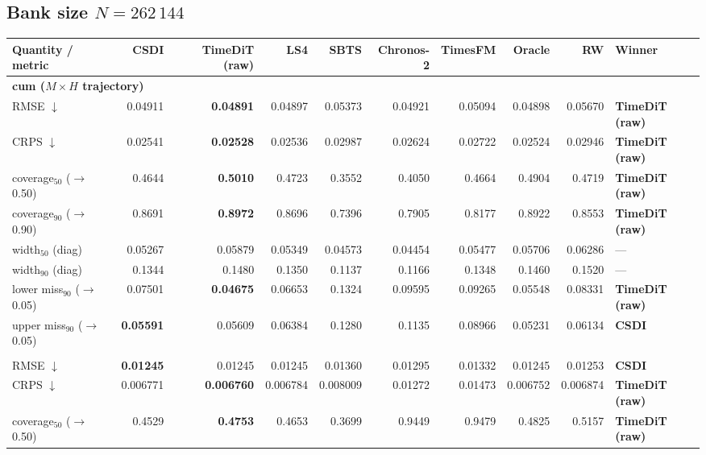 \documentclass[11pt,a4paper]{article}
\begin{document}
\begin{landscape}
\subsection{Bank size $N = 262\,144$}
\begin{center}\footnotesize
\begin{tabular}{lrrrrrrrrl}
\toprule
Quantity / metric & CSDI & TimeDiT (raw) & LS4 & SBTS & Chronos-2 & TimesFM & Oracle & RW & Winner \\
\midrule
\multicolumn{10}{l}{\textbf{cum ($M\times H$ trajectory)}} \\
RMSE $\downarrow$ & 0.04911 & \textbf{0.04891} & 0.04897 & 0.05373 & 0.04921 & 0.05094 & 0.04898 & 0.05670 & \textbf{TimeDiT (raw)} \\
CRPS $\downarrow$ & 0.02541 & \textbf{0.02528} & 0.02536 & 0.02987 & 0.02624 & 0.02722 & 0.02524 & 0.02946 & \textbf{TimeDiT (raw)} \\
coverage$_{50}$ ($\to$0.50) & 0.4644 & \textbf{0.5010} & 0.4723 & 0.3552 & 0.4050 & 0.4664 & 0.4904 & 0.4719 & \textbf{TimeDiT (raw)} \\
coverage$_{90}$ ($\to$0.90) & 0.8691 & \textbf{0.8972} & 0.8696 & 0.7396 & 0.7905 & 0.8177 & 0.8922 & 0.8553 & \textbf{TimeDiT (raw)} \\
width$_{50}$ (diag) & 0.05267 & 0.05879 & 0.05349 & 0.04573 & 0.04454 & 0.05477 & 0.05706 & 0.06286 & --- \\
width$_{90}$ (diag) & 0.1344 & 0.1480 & 0.1350 & 0.1137 & 0.1166 & 0.1348 & 0.1460 & 0.1520 & --- \\
lower miss$_{90}$ ($\to$0.05) & 0.07501 & \textbf{0.04675} & 0.06653 & 0.1324 & 0.09595 & 0.09265 & 0.05548 & 0.08331 & \textbf{TimeDiT (raw)} \\
upper miss$_{90}$ ($\to$0.05) & \textbf{0.05591} & 0.05609 & 0.06384 & 0.1280 & 0.1135 & 0.08966 & 0.05231 & 0.06134 & \textbf{CSDI} \\
\addlinespace
\multicolumn{10}{l}{\textbf{step ($M\times H$)}} \\
RMSE $\downarrow$ & \textbf{0.01245} & 0.01245 & 0.01245 & 0.01360 & 0.01295 & 0.01332 & 0.01245 & 0.01253 & \textbf{CSDI} \\
CRPS $\downarrow$ & 0.006771 & \textbf{0.006760} & 0.006784 & 0.008009 & 0.01272 & 0.01473 & 0.006752 & 0.006874 & \textbf{TimeDiT (raw)} \\
coverage$_{50}$ ($\to$0.50) & 0.4529 & \textbf{0.4753} & 0.4653 & 0.3699 & 0.9449 & 0.9479 & 0.4825 & 0.5157 & \textbf{TimeDiT (raw)} \\

\end{tabular}
\end{center}
\end{landscape}
\end{document}

